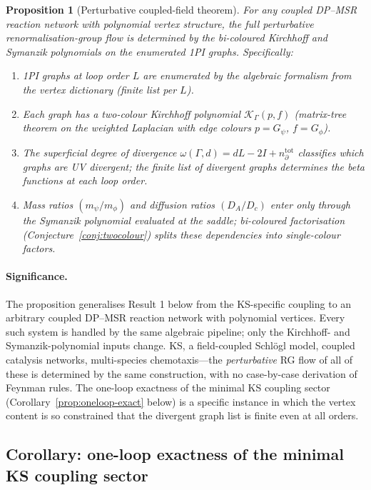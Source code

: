 \documentclass[11pt,a4paper]{article}
\theoremstyle{plain}
\newtheorem{proposition}[theorem]{Proposition}
\begin{document}
\begin{proposition}[Perturbative coupled-field theorem]
\label{prop:perturbative}
For any coupled DP--MSR reaction network with polynomial vertex
structure, the full perturbative renormalisation-group flow is
determined by the bi-coloured Kirchhoff and Symanzik polynomials
on the enumerated 1PI graphs.  Specifically:
\begin{enumerate}[leftmargin=1.8em, itemsep=-0.2em]
\item 1PI graphs at loop order $L$ are enumerated by the algebraic
  formalism from the vertex dictionary (finite list per $L$).
\item Each graph has a two-colour Kirchhoff polynomial
  $\mathcal{K}_\Gamma(p, f)$ (matrix-tree theorem on the
  weighted Laplacian with edge colours $p = G_\psi$,
  $f = G_\phi$).
\item The superficial degree of divergence
  $\omega(\Gamma, d) = dL - 2I + n_\partial^{\mathrm{tot}}$
  classifies which graphs are UV divergent; the finite list of
  divergent graphs determines the beta functions at each loop
  order.
\item Mass ratios $(m_\psi/m_\phi)$ and diffusion ratios
  $(D_A/D_c)$ enter only through the Symanzik polynomial
  evaluated at the saddle; bi-coloured factorisation
  (Conjecture~\ref{conj:twocolour}) splits these dependencies
  into single-colour factors.
\end{enumerate}
\end{proposition}

\paragraph{Significance.}
The proposition generalises Result 1 below from the KS-specific
coupling to an arbitrary coupled DP--MSR reaction network with
polynomial vertices.  Every such system is handled by the same
algebraic pipeline; only the Kirchhoff- and Symanzik-polynomial
inputs change.  KS, a field-coupled Schl\"ogl model, coupled
catalysis networks, multi-species chemotaxis---the
\emph{perturbative} RG flow of all of these is determined by the
same construction, with no case-by-case derivation of Feynman
rules.  The one-loop exactness of the minimal KS coupling sector
(Corollary~\ref{prop:oneloop-exact} below) is a specific instance
in which the vertex content is so constrained that the divergent
graph list is finite even at all orders.

\subsection{Corollary: one-loop exactness of the minimal KS
coupling sector}
\end{document}
